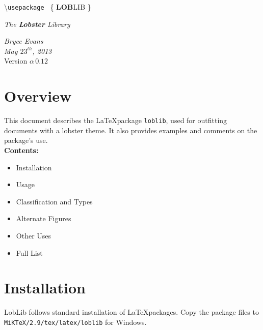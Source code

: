 \documentclass[11pt]{article}
\begin{document}
\vspace*{-3cm}			
\hspace*{-0.5cm}		

\vspace*{-2cm}

\Large \hspace{5em} {\color{darkgrey}\textbackslash \texttt{usepackage
}}
\Huge \{ \textbf{LOB}LIB \}

		\begin{center}
\hspace{7em} \huge \textit{{\color{crimson} The \textbf{Lobster} Library}}
\end{center}


\normalsize


\textit{Bryce Evans} \\
\textit{May $23^{th}$, 2013}\\
Version $\alpha\, 0.12$ \\



\section*{Overview}

This document describes the \LaTeX package \texttt{loblib}, used for outfitting documents with a lobster theme. It also provides examples and comments on the package's use. \\


\textbf{Contents:}
\begin{itemize} \itemsep-0em 
\item Installation
\item Usage
\item Classification and Types
\item Alternate Figures
\item Other Uses
\item Full List
\end{itemize}

\vspace*{-3.5cm}
\hspace*{7.5cm} 
 \hfill
\vspace*{-1.5cm} 

\section*{Installation}
LobLib follows standard installation of \LaTeX packages.
Copy the package files to\\ \texttt{MiKTeX/2.9/tex/latex/loblib} for Windows.\\
\end{document}
